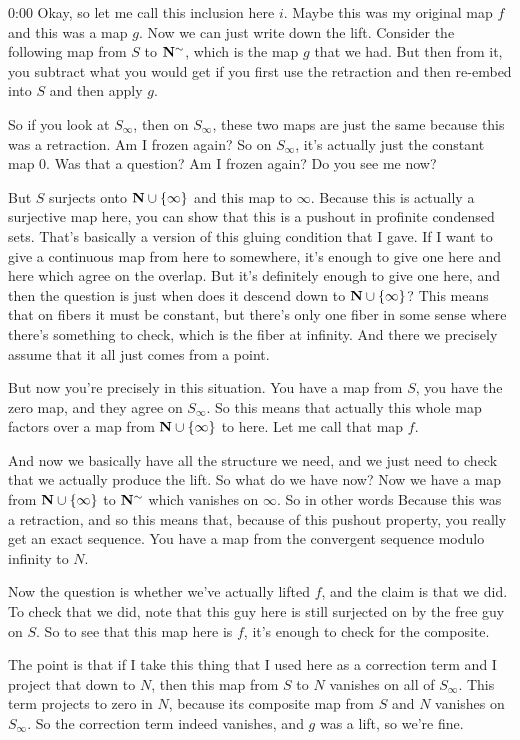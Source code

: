 \begin{unfinished}{0:00}
Okay, so let me call this inclusion here $i$. Maybe this was my original map $f$ and this was a map $g$. Now we can just write down the lift. Consider the following map from $S$ to $\mathbf N^\sim$, which is the map $g$ that we had. But then from it, you subtract what you would get if you first use the retraction and then re-embed into $S$ and then apply $g$.

So if you look at $S_\infty$, then on $S_\infty$, these two maps are just the same because this was a retraction. Am I frozen again? So on $S_\infty$, it's actually just the constant map $0$. Was that a question? Am I frozen again? Do you see me now?

But $S$ surjects onto $\mathbf N \cup \{\infty\}$ and this map to $\infty$. Because this is actually a surjective map here, you can show that this is a pushout in profinite condensed sets. That's basically a version of this gluing condition that I gave. If I want to give a continuous map from here to somewhere, it's enough to give one here and here which agree on the overlap. But it's definitely enough to give one here, and then the question is just when does it descend down to $\mathbf N \cup \{\infty\}$? This means that on fibers it must be constant, but there's only one fiber in some sense where there's something to check, which is the fiber at infinity. And there we precisely assume that it all just comes from a point.

But now you're precisely in this situation. You have a map from $S$, you have the zero map, and they agree on $S_\infty$. So this means that actually this whole map factors over a map from $\mathbf N \cup \{\infty\}$ to here. Let me call that map $f$.

And now we basically have all the structure we need, and we just need to check that we actually produce the lift. So what do we have now? Now we have a map from $\mathbf N \cup \{\infty\}$ to $\mathbf N^\sim$ which vanishes on $\infty$. So in other words
Because this was a retraction, and so this means that, because of this pushout property, you really get an exact sequence. You have a map from the convergent sequence modulo infinity to $N$.

Now the question is whether we've actually lifted $f$, and the claim is that we did. To check that we did, note that this guy here is still surjected on by the free guy on $S$. So to see that this map here is $f$, it's enough to check for the composite.

The point is that if I take this thing that I used here as a correction term and I project that down to $N$, then this map from $S$ to $N$ vanishes on all of $S_\infty$. This term projects to zero in $N$, because its composite map from $S$ and $N$ vanishes on $S_\infty$. So the correction term indeed vanishes, and $g$ was a lift, so we're fine.


\end{unfinished}

